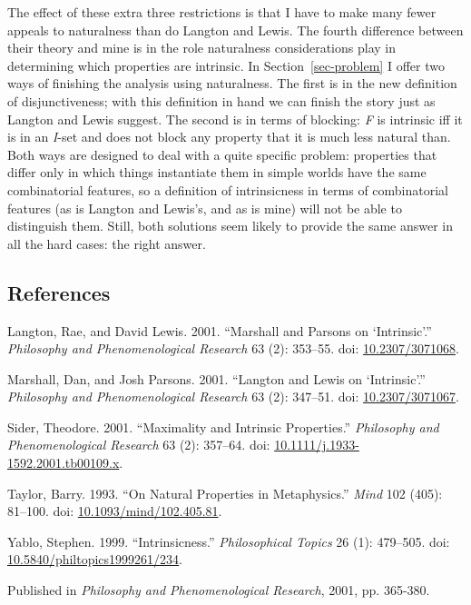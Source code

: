 \documentclass[
  10pt,
  letterpaper,
  DIV=11,
  numbers=noendperiod,
  twoside]{scrartcl}
\newlength{\cslhangindent}
\newenvironment{CSLReferences}[2] %
 {\begin{list}{}{%
  \setlength{\itemindent}{0pt}
  \setlength{\leftmargin}{0pt}
  \setlength{\parsep}{0pt}
  \ifodd #1
   \setlength{\leftmargin}{\cslhangindent}
   \setlength{\itemindent}{-1\cslhangindent}
  \fi
  \setlength{\itemsep}{#2\baselineskip}}}
 {\end{list}}
\begin{document}
The effect of these extra three restrictions is that I have to make many
fewer appeals to naturalness than do Langton and Lewis. The fourth
difference between their theory and mine is in the role naturalness
considerations play in determining which properties are intrinsic. In
Section~\ref{sec-problem} I offer two ways of finishing the analysis
using naturalness. The first is in the new definition of
disjunctiveness; with this definition in hand we can finish the story
just as Langton and Lewis suggest. The second is in terms of blocking:
\emph{F} is intrinsic iff it is in an \emph{I}-set and does not block
any property that it is much less natural than. Both ways are designed
to deal with a quite specific problem: properties that differ only in
which things instantiate them in simple worlds have the same
combinatorial features, so a definition of intrinsicness in terms of
combinatorial features (as is Langton and Lewis's, and as is mine) will
not be able to distinguish them. Still, both solutions seem likely to
provide the same answer in all the hard cases: the right answer.

\subsection*{References}\label{references}

\label{refs}
\begin{CSLReferences}{1}{0}
Langton, Rae, and David Lewis. 2001. {``Marshall and {P}arsons on
{`Intrinsic'}.''} \emph{Philosophy and Phenomenological Research} 63
(2): 353--55. doi:
\href{https://doi.org/10.2307/3071068}{10.2307/3071068}.

Marshall, Dan, and Josh Parsons. 2001. {``Langton and Lewis on
{`Intrinsic'}.''} \emph{Philosophy and Phenomenological Research} 63
(2): 347--51. doi:
\href{https://doi.org/10.2307/3071067}{10.2307/3071067}.

Sider, Theodore. 2001. {``Maximality and Intrinsic Properties.''}
\emph{Philosophy and Phenomenological Research} 63 (2): 357--64. doi:
\href{https://doi.org/10.1111/j.1933-1592.2001.tb00109.x}{10.1111/j.1933-1592.2001.tb00109.x}.

Taylor, Barry. 1993. {``On Natural Properties in Metaphysics.''}
\emph{Mind} 102 (405): 81--100. doi:
\href{https://doi.org/10.1093/mind/102.405.81}{10.1093/mind/102.405.81}.

Yablo, Stephen. 1999. {``Intrinsicness.''} \emph{Philosophical Topics}
26 (1): 479--505. doi:
\href{https://doi.org/10.5840/philtopics1999261/234}{10.5840/philtopics1999261/234}.

\end{CSLReferences}



\noindent Published in\emph{
Philosophy and Phenomenological Research}, 2001, pp. 365-380.
\end{document}
